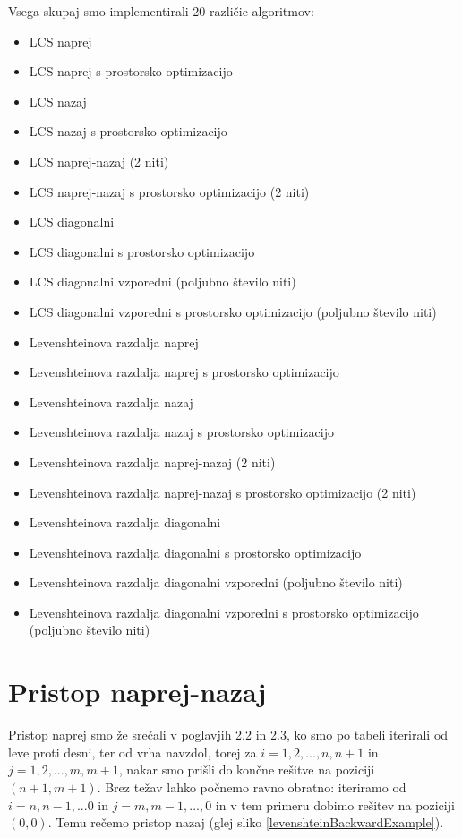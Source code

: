 \documentclass[a4paper,12pt,openright]{book}
\begin{document}
Vsega skupaj smo implementirali 20 različic algoritmov:
\begin{itemize}
  \item LCS naprej 
  \item LCS naprej s prostorsko optimizacijo
  \item LCS nazaj 
  \item LCS nazaj s prostorsko optimizacijo
  \item LCS naprej-nazaj (2 niti)
  \item LCS naprej-nazaj s prostorsko optimizacijo (2 niti)
  \item LCS diagonalni
  \item LCS diagonalni s prostorsko optimizacijo
  \item LCS diagonalni vzporedni (poljubno število niti)
  \item LCS diagonalni vzporedni s prostorsko optimizacijo (poljubno število niti)
  \item Levenshteinova razdalja naprej 
  \item Levenshteinova razdalja naprej s prostorsko optimizacijo
  \item Levenshteinova razdalja nazaj 
  \item Levenshteinova razdalja nazaj s prostorsko optimizacijo
  \item Levenshteinova razdalja naprej-nazaj (2 niti)
  \item Levenshteinova razdalja naprej-nazaj s prostorsko optimizacijo (2 niti)
  \item Levenshteinova razdalja diagonalni
  \item Levenshteinova razdalja diagonalni s prostorsko optimizacijo
  \item Levenshteinova razdalja diagonalni vzporedni (poljubno število niti)
  \item Levenshteinova razdalja diagonalni vzporedni s prostorsko optimizacijo (poljubno število niti)
\end{itemize}

\section{Pristop naprej-nazaj}

Pristop naprej smo že srečali v poglavjih 2.2 in 2.3, ko smo po tabeli iterirali od leve proti desni, ter od vrha navzdol, torej za $i = 1,2, ..., n, n+1$ in $j = 1,2, ..., m, m+1$, nakar smo prišli do končne rešitve na poziciji $(n+1, m+1)$. Brez težav lahko počnemo ravno obratno: iteriramo od $i = n, n-1, ... 0$ in $j = m, m-1, ..., 0$ in v tem primeru dobimo rešitev na poziciji $(0, 0)$. Temu rečemo pristop nazaj (glej sliko \ref{levenshteinBackwardExample}). 
\end{document}
